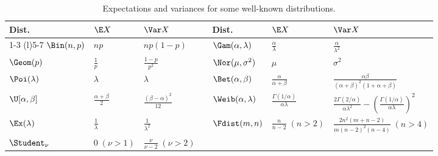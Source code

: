 \begin{table}[H]
	\centering
	\caption{Expectations and variances for some well-known distributions.}
	\label{tab:ExpectationsVariances}
	\renewcommand{\arraystretch}{2.2}
	\begin{tabular}{@{}lll c lll@{}}
		\toprule
		Dist.               & \(\E X\)                     & \(\Var X\)                         & \hspace{1cm} & Dist.                    & \(\E X\)                                    & \(\Var X\)                                                                                             \\
		\cmidrule(r){1-3} \cmidrule(l){5-7}
		\(\Bin(n, p)\)        & \(np\)                       & \(np(1 - p)\)                      &              & \(\Gam(\alpha, \lambda)\)  & \(\frac{\alpha}{\lambda}\)                  & \(\frac{\alpha}{\lambda^2}\)                                                                           \\
		\(\Geom(p)\)          & \(\frac{1}{p}\)              & \(\frac{1 - p}{p^2}\)              &              & \(\Nor(\mu, \sigma^2)\)    & \(\mu\)                                     & \(\sigma^2\)                                                                                           \\
		\(\Poi(\lambda)\)     & \(\lambda\)                  & \(\lambda\)                        &              & \(\Bet(\alpha, \beta)\)    & \(\frac{\alpha}{\alpha+\beta}\)             & \(\frac{\alpha\beta}{(\alpha+\beta)^2(1+\alpha+\beta)}\)                                               \\
		\(\U[\alpha, \beta]\) & \(\frac{\alpha + \beta}{2}\) & \(\frac{(\beta - \alpha)^2}{12}\)  &              & \(\Weib(\alpha, \lambda)\) & \(\frac{\Gamma(1/\alpha)}{\alpha \lambda}\) & \(\frac{2\Gamma(2/\alpha)}{\alpha\lambda^2} - \left(\frac{\Gamma(1/\alpha)}{\alpha \lambda}\right)^2\) \\
		\(\Ex(\lambda)\)      & \(\frac{1}{\lambda}\)        & \(\frac{1}{\lambda^2}\)            &              & \(\Fdist(m, n)\)           & \(\frac{n}{n-2} \; (n > 2)\)                & \(\frac{2n^2(m+n-2)}{m(n-2)^2(n-4)} \; (n > 4)\)                                                       \\
		\(\Student_\nu\)      & \(0 \; (\nu > 1)\)           & \(\frac{\nu}{\nu-2} \; (\nu > 2)\) &              &                          &                                           &                                                                                                      \\
		\bottomrule
	\end{tabular}
\end{table}

